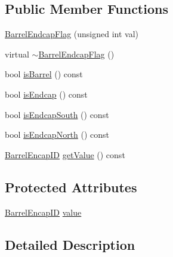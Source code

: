 \subsection*{Public Member Functions}
\begin{DoxyCompactItemize}
\item 
\hyperlink{class_d_d4hep_1_1_d_d_rec_1_1_i_d_decoder_1_1_barrel_endcap_flag_acecd6351bd9d45414c9689c222eb719b}{BarrelEndcapFlag} (unsigned int val)
\item 
virtual \hyperlink{class_d_d4hep_1_1_d_d_rec_1_1_i_d_decoder_1_1_barrel_endcap_flag_a49909f06796881e12c94f8a545f19e28}{$\sim$BarrelEndcapFlag} ()
\item 
bool \hyperlink{class_d_d4hep_1_1_d_d_rec_1_1_i_d_decoder_1_1_barrel_endcap_flag_a4b2c475e311e18ab65eb80f7fd0b9c9d}{isBarrel} () const 
\item 
bool \hyperlink{class_d_d4hep_1_1_d_d_rec_1_1_i_d_decoder_1_1_barrel_endcap_flag_ad22c146907d9df1396a21cd81246e754}{isEndcap} () const 
\item 
bool \hyperlink{class_d_d4hep_1_1_d_d_rec_1_1_i_d_decoder_1_1_barrel_endcap_flag_aa33d11a4be4d117089ed62084ff1dc89}{isEndcapSouth} () const 
\item 
bool \hyperlink{class_d_d4hep_1_1_d_d_rec_1_1_i_d_decoder_1_1_barrel_endcap_flag_a15053aeb2df9da99f106b3c38d54c6b7}{isEndcapNorth} () const 
\item 
\hyperlink{class_d_d4hep_1_1_d_d_rec_1_1_i_d_decoder_1_1_barrel_endcap_flag_acbdae4d36c49605ada531eddce7b60d8}{BarrelEncapID} \hyperlink{class_d_d4hep_1_1_d_d_rec_1_1_i_d_decoder_1_1_barrel_endcap_flag_a514c87353c666b18e6dbbfc2d9dd9136}{getValue} () const 
\end{DoxyCompactItemize}
\subsection*{Protected Attributes}
\begin{DoxyCompactItemize}
\item 
\hyperlink{class_d_d4hep_1_1_d_d_rec_1_1_i_d_decoder_1_1_barrel_endcap_flag_acbdae4d36c49605ada531eddce7b60d8}{BarrelEncapID} \hyperlink{class_d_d4hep_1_1_d_d_rec_1_1_i_d_decoder_1_1_barrel_endcap_flag_a7521612ff515aea981e4136b33d7b06e}{value}
\end{DoxyCompactItemize}


\subsection{Detailed Description}


